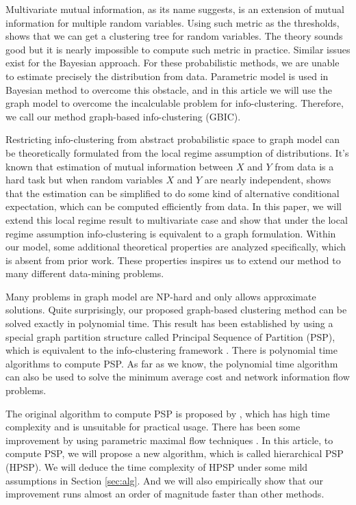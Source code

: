 Multivariate mutual information, as its name suggests, is an extension of mutual information for multiple
random variables. Using such metric as the thresholds, \citet{ic2016} shows that we can get a clustering
tree for random variables. The theory sounds good but it is nearly impossible to compute such metric
in practice. Similar issues exist for the Bayesian approach. For these probabilistic methods, we
are unable to estimate precisely the distribution from data. Parametric model is used in Bayesian
method to overcome this obstacle, and in this article we will use the graph model to overcome the incalculable problem for info-clustering.
Therefore, we call our method graph-based info-clustering (GBIC).

Restricting info-clustering from abstract probabilistic space to graph model can be theoretically formulated from the local regime assumption of distributions. It's known that estimation of mutual information between $X$ and $Y$ from data is a hard task but when random variables $X$ and $Y$ are nearly independent, \citet{huang2017information} shows that the estimation can be simplified to do some kind of alternative conditional expectation, which can be computed efficiently from data. In this paper, we will extend this local regime result to multivariate case and show that under the local regime assumption info-clustering is equivalent to a graph formulation. Within our model, some additional theoretical properties are analyzed specifically, which is absent from prior work. These properties inspires us to extend our method to many different data-mining problems.


Many problems in graph model are NP-hard and only allows approximate solutions. Quite surprisingly, our proposed graph-based clustering method can be solved exactly in polynomial time.
This result has been established by using a special graph partition structure called Principal Sequence of Partition (PSP), which is equivalent to the info-clustering framework \citep{ic2016}. There is polynomial time algorithms to compute PSP. As far as we know, the polynomial time algorithm can also be used to solve the minimum average cost \citep{mac} and network information flow \citep{pin} problems.

The original algorithm to compute PSP is proposed by
\citet{narayanan}, which has high time complexity and is unsuitable for practical usage.
There has been some improvement
by using parametric maximal flow techniques \citep{kolmogorov}. In this article, to compute PSP, we will propose a new algorithm, which is called hierarchical PSP (HPSP). We will deduce the time complexity of HPSP under some mild assumptions in Section \ref{sec:alg}. And we will also empirically show that our improvement runs almost an order of magnitude faster than other methods.


